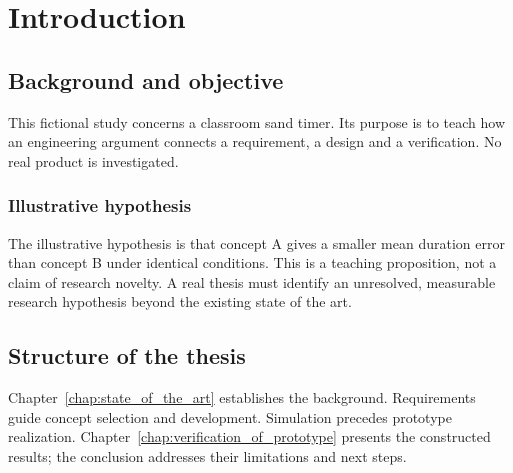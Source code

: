 \chapter{Introduction}
\label{chap:introduction}

\section{Background and objective}
\label{sec:background}
This fictional study concerns a classroom sand timer. Its purpose is to teach
how an engineering argument connects a requirement, a design and a verification.
No real product is investigated.

\subsection{Illustrative hypothesis}
\label{sec:hypothesis}
The illustrative hypothesis is that concept A gives a smaller mean duration
error than concept B under identical conditions. This is a teaching proposition,
not a claim of research novelty. A real thesis must identify an unresolved,
measurable research hypothesis beyond the existing state of the art.

\section{Structure of the thesis}
Chapter~\ref{chap:state_of_the_art} establishes the background.
Requirements guide concept selection and development. Simulation precedes
prototype realization. Chapter~\ref{chap:verification_of_prototype} presents the
constructed results; the conclusion addresses their limitations and next steps.
